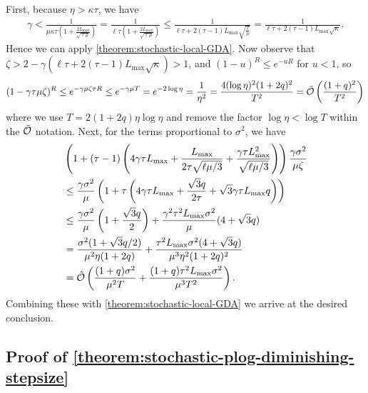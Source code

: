 \documentclass{article}
\newcommand{\cO}{{\mathcal{O}}}
\theoremstyle{plain}
\theoremstyle{remark}
\begin{document}
First, because $\eta > \kappa\tau$, we have
\begin{align*}
    \gamma < \frac{1}{\mu \kappa \tau \left( 1 + \frac{2L_{\mathrm{max}}}{\sqrt{\ell\mu}} \right)} = \frac{1}{\ell\tau \left( 1 + \frac{2L_{\mathrm{max}}}{\sqrt{\ell\mu}} \right)} \le \frac{1}{\ell\tau + 2(\tau - 1) L_{\mathrm{max}} \sqrt{\frac{\ell}{\mu}}} = \frac{1}{\ell\tau + 2(\tau - 1) L_{\mathrm{max}} \sqrt{\kappa}} .
\end{align*}
Hence we can apply \cref{theorem:stochastic-local-GDA}.
Now observe that $\zeta > 2 - \gamma \left( \ell\tau + 2(\tau - 1) L_{\mathrm{max}} \sqrt{\kappa} \right) > 1$, and $(1-u)^R \le e^{-uR}$ for $u < 1$, so
\begin{align*}
    (1 - \gamma\tau\mu\zeta)^R \le e^{-\gamma\mu\zeta\tau R} \le e^{-\gamma\mu T} = e ^{-2\log\eta} = \frac{1}{\eta^2} = \frac{4 (\log\eta)^2 (1+2q)^2}{T^2} = \Tilde{\cO} \left( \frac{(1+q)^2}{T^2} \right) 
\end{align*}
where we use $T = 2(1+2q)\eta \log\eta$
and remove the factor $\log \eta < \log T$ within the $\Tilde{\cO}$ notation.
Next, for the terms proportional to $\sigma^2$, we have
\begin{align*}
    & \left( 1 + (\tau - 1) \left( 4\gamma\tau L_{\mathrm{max}} + \frac{L_{\mathrm{max}}}{2\tau\sqrt{\ell\mu/3}} + \frac{\gamma\tau L_{\mathrm{max}}^2}{\sqrt{\ell\mu/3}} \right) \right) \frac{\gamma\sigma^2}{\mu\zeta} \\
    & \le \frac{\gamma\sigma^2}{\mu} \left( 1 + \tau \left( 4\gamma\tau L_{\mathrm{max}} + \frac{\sqrt{3} q}{2\tau} + \sqrt{3} \gamma\tau L_{\mathrm{max}} q \right) \right) \\
    & \le \frac{\gamma\sigma^2}{\mu} \left( 1 + \frac{\sqrt{3}q}{2} \right) + \frac{\gamma^2 \tau^2 L_{\mathrm{max}} \sigma^2}{\mu} (4 + \sqrt{3}q) \\
    & = \frac{\sigma^2 (1+\sqrt{3}q/2)}{\mu^2 \eta (1+2q)} + \frac{\tau^2 L_{\mathrm{max}} \sigma^2 (4+\sqrt{3}q)}{\mu^3 \eta^2 (1+2q)^2} \\
    & = \Tilde{\cO} \left( \frac{(1+q) \sigma^2}{\mu^2 T} + \frac{(1+q) \tau^2 L_{\mathrm{max}} \sigma^2}{\mu^3 T^2} \right) .
\end{align*}
Combining these with \cref{theorem:stochastic-local-GDA} we arrive at the desired conclusion.

\subsection{Proof of \cref{theorem:stochastic-plog-diminishing-stepsize}}
\end{document}
